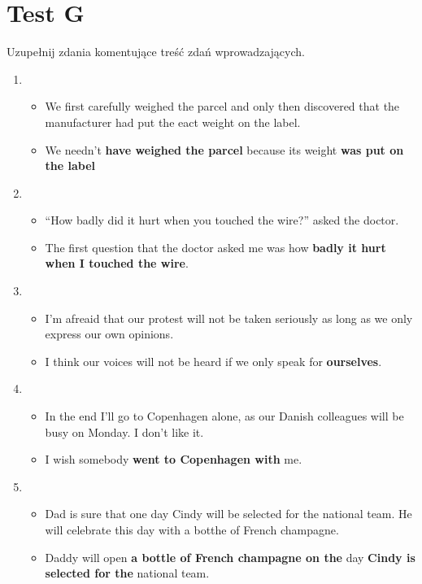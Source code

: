 \documentclass[a4paper]{article}
\begin{document}
\section{Test G}
Uzupełnij zdania komentujące treść zdań wprowadzających.
\begin{enumerate}
    \item \begin{itemize}
        \item We first carefully weighed the parcel and only then discovered that the manufacturer had put the eact weight on the label.
        \item We needn't {\bf have weighed the parcel} because its weight {\bf was put on the label}
    \end{itemize}
    \item \begin{itemize}
        \item ``How badly did it hurt when you touched the wire?'' asked the doctor.
        \item The first question that the doctor asked me was how {\bf badly it hurt when I touched the wire}. 
    \end{itemize}
    \item \begin{itemize}
        \item I'm afreaid that our protest will not be taken seriously as long as we only express our own opinions.
        \item I think our voices will not be heard if we only speak for {\bf ourselves}.
    \end{itemize}
    \item \begin{itemize}
        \item In the end I'll go to Copenhagen alone, as our Danish colleagues will be busy on Monday. I don't like it.
        \item I wish somebody {\bf went to Copenhagen with} me. 
    \end{itemize}
    \item \begin{itemize}
        \item Dad is sure that one day Cindy will be selected for the national team. He will celebrate this day with a botthe of French champagne.
        \item Daddy will open {\bf a bottle of French champagne on the} day {\bf Cindy is selected for the} national team.
    \end{itemize}

\end{enumerate}
\end{document}
